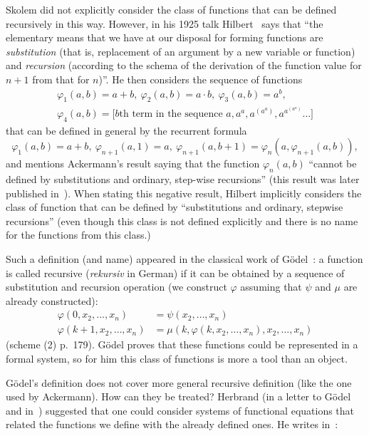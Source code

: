 \documentclass[12pt]{article}
\theoremstyle{remark}
\begin{document}
Skolem did not explicitly consider the class of functions that can be defined recursively in this way. However, in his 1925 talk Hilbert~\cite{Hilbert1926} says that ``the elementary means that we have at our disposal for forming functions are \emph{substitution} (that is, replacement of an argument by a new variable or function) and \emph{recursion} (according to the schema of the derivation of the function value for $n+1$ from that for $n$)''. He then considers the sequence of functions
\begin{multline*}
\varphi_1(a,b)=a+b, \ \varphi_2(a,b)=a\cdot b,  \ \varphi_3(a,b)=a^b,\\
\varphi_4(a,b)= \text{[$b$th term in the sequence $a, a^a, a^{(a^a)}, a^{a^{(a^a)}}\ldots$]}
\end{multline*}
that can be defined in general by the recurrent formula
\[
\varphi_1(a,b)=a+b, \ \varphi_{n+1}(a,1)=a,  \ \varphi_{n+1}(a,b+1)=\varphi_n(a,\varphi_{n+1}(a,b)),
\]
and mentions Ackermann's result saying that the function  $\varphi_n(a,b)$ ``cannot be defined by substitutions and ordinary, step-wise recursions'' (this result was later published in~\cite{Ackermann1928}). When stating this negative result, Hilbert implicitly considers the class of function that can be defined by ``substitutions and ordinary, stepwise recursions'' (even though this class is not defined explicitly and there is no name for the functions from this class.)

Such a definition (and name) appeared in the classical work of G\"{o}del~\cite[p.~179]{Godel1931}: a function is called recursive (\emph{rekursiv} in German) if it can be obtained by a sequence of substitution and recursion operation (we construct $\varphi$ assuming that $\psi$ and $\mu$ are already constructed): 
\begin{align*}
\varphi(0,x_2,\ldots,x_n)&=\psi(x_2,\ldots,x_n)\\
\varphi(k+1,x_2,\ldots,x_n)&=\mu(k,\varphi(k,x_2,\ldots,x_n),x_2,\ldots,x_n)
\end{align*}
(scheme (2) p.~179). G\"{o}del proves that these functions could be represented in a formal system, so for him this class of functions is more a tool than an object.

G\"{o}del's definition does not cover more general recursive definition (like the one used by Ackermann). How can they be treated? Herbrand (in a letter to G\"{o}del and in~\cite{Herbrand1932}) suggested that one could consider systems of functional equations that related the functions we define with the already defined ones. He writes in~\cite[p.~5, p.~624 of the English translation]{Herbrand1932}:
\end{document}
